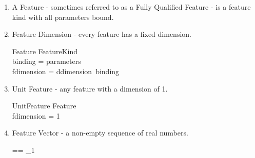 \documentclass[11pt]{article}
\begin{document}
\begin{enumerate}
\item A \textsf{Feature} -  sometimes referred to as a Fully Qualified Feature - is  a feature kind with all parameters bound. 

\item \textsf{Feature Dimension} - every feature has a fixed  dimension. 

\begin{schema}{Feature}
	FeatureKind \\
\where
	\dom binding = parameters \\
	fdimension = ddimension~binding
\end{schema}

\item \textsf{Unit Feature} - any feature with a dimension of 1.
	
\begin{schema}{UnitFeature}
	Feature \\
\where
	fdimension = 1
\end{schema}

\item \textsf{Feature Vector} - a non-empty sequence of real numbers.

\begin{zed}
	\FV == \seq_1 \R 
\end{zed}



\newcommand{\Vdsl}{\mathrel{~FV^{d * sl}}}


\newcommand{\Vd}{\mathrel{~FV^{d}}}


\newcommand{\Z}{\mathrel{~FV^{1}}}


\newcommand{\Vsl}{\mathrel{~FV^{sl}}}




\end{enumerate}
\end{document}
